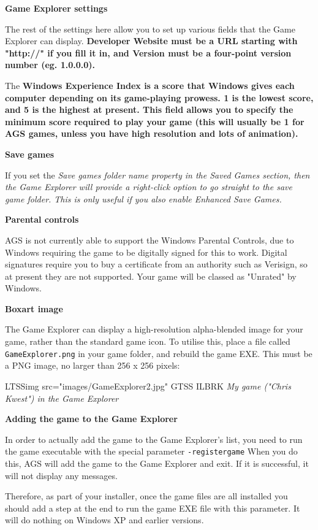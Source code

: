 \bf{Game Explorer settings}

The rest of the settings here allow you to set up various fields that the Game Explorer
can display. \bf{Developer Website} must be a URL starting with "http://" if you fill
it in, and \bf{Version} must be a four-point version number (eg. 1.0.0.0).

The \bf{Windows Experience Index} is a score that Windows gives each computer depending
on its game-playing prowess. 1 is the lowest score, and 5 is the highest at present.
This field allows you to specify the minimum score required to play your game (this
will usually be 1 for AGS games, unless you have high resolution and lots of animation).

\bf{Save games}

If you set the \it{Save games folder name} property in the Saved Games section, then
the Game Explorer will provide a right-click option to go straight to the save game folder.
This is only useful if you also enable Enhanced Save Games.

\bf{Parental controls}

AGS is not currently able to support the Windows Parental Controls, due to Windows requiring
the game to be digitally signed for this to work. Digital signatures require you to buy
a certificate from an authority such as Verisign, so at present they are not supported.
Your game will be classed as "Unrated" by Windows.

\bf{Boxart image}

The Game Explorer can display a high-resolution alpha-blended image for your game, rather
than the standard game icon. To utilise this, place a file called \verb$GameExplorer.png$
in your game folder, and rebuild the game EXE. This must be a PNG image, no larger
than 256 x 256 pixels:

LTSSimg src="images/GameExplorer2.jpg" GTSS ILBRK
\it{My game ("Chris Kwest") in the Game Explorer}

\bf{Adding the game to the Game Explorer}

In order to actually add the game to the Game Explorer's list, you need to run the
game executable with the special parameter \verb$-registergame$  When you do this,
AGS will add the game to the Game Explorer and exit. If it is successful, it will
not display any messages.

Therefore, as part of your installer, once the game files are all installed you should
add a step at the end to run the game EXE file with this parameter. It will do nothing
on Windows XP and earlier versions.

